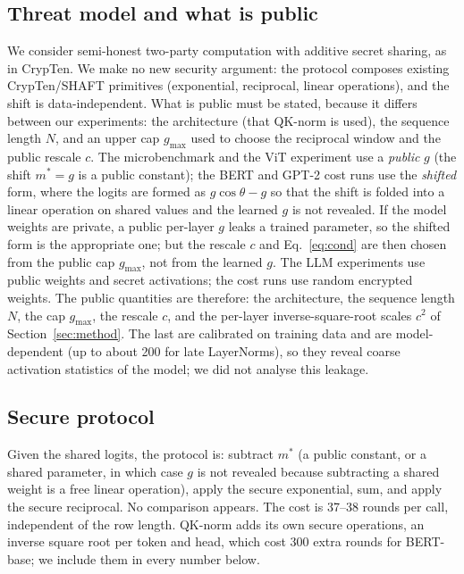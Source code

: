 \documentclass[11pt]{article}
\newcommand{\mstar}{m^{*}}
\begin{document}
\subsection{Threat model and what is public}
We consider semi-honest two-party computation with additive secret sharing, as in CrypTen. We make no new security
argument: the protocol composes existing CrypTen/SHAFT primitives (exponential, reciprocal, linear operations), and the
shift is data-independent. What is public must be stated, because it differs between our experiments:
the architecture (that QK-norm is used), the sequence length $N$, and an upper cap $g_{\max}$ used to choose the
reciprocal window and the public rescale $c$. The microbenchmark and the ViT experiment use a \emph{public} $g$
(the shift $m^*=g$ is a public constant); the BERT and GPT-2 cost runs use the \emph{shifted} form, where the logits are
formed as $g\cos\theta-g$ so that the shift is folded into a linear operation on shared values and the learned $g$ is not revealed.
If the model weights are private, a public per-layer $g$ leaks a trained parameter, so the shifted form is the
appropriate one; but the rescale $c$ and Eq.~\eqref{eq:cond} are then chosen from the public cap $g_{\max}$, not from the
learned $g$. The LLM experiments use public weights and secret activations; the cost runs use random encrypted weights.
The public quantities are therefore: the architecture, the sequence length $N$, the cap $g_{\max}$, the rescale $c$, and the per-layer inverse-square-root scales $c^{2}$ of Section~\ref{sec:method}. The last are calibrated on training data and are model-dependent (up to about 200 for late LayerNorms), so they reveal coarse activation statistics of the model; we did not analyse this leakage.

\subsection{Secure protocol}
Given the shared logits, the protocol is: subtract $\mstar$ (a public constant, or a shared
parameter, in which case $g$ is not revealed because subtracting a shared weight is a free linear
operation), apply the secure exponential, sum, and apply the secure reciprocal. No comparison
appears. The cost is 37--38 rounds per call, independent of the row length. QK-norm adds its own
secure operations, an inverse square root per token and head, which cost 300 extra rounds for
BERT-base; we include them in every number below.
\end{document}
